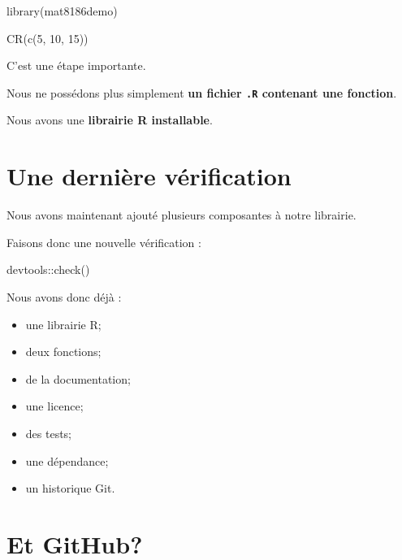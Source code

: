\documentclass[
  letterpaper,
  DIV=11,
  numbers=noendperiod]{scrreprt}
\newenvironment{Shaded}{\begin{snugshade}}{\end{snugshade}}
\newcommand{\DecValTok}[1]{\textcolor[rgb]{0.68,0.00,0.00}{#1}}
\newcommand{\FunctionTok}[1]{\textcolor[rgb]{0.28,0.35,0.67}{#1}}
\newcommand{\NormalTok}[1]{\textcolor[rgb]{0.00,0.23,0.31}{#1}}
\newcommand{\SpecialCharTok}[1]{\textcolor[rgb]{0.37,0.37,0.37}{#1}}
\providecommand{\tightlist}{%
  \setlength{\itemsep}{0pt}\setlength{\parskip}{0pt}}\usepackage{longtable,booktabs,array}
\begin{document}
\begin{Shaded}
\begin{Highlighting}[]
\FunctionTok{library}\NormalTok{(mat8186demo)}

\FunctionTok{CR}\NormalTok{(}\FunctionTok{c}\NormalTok{(}\DecValTok{5}\NormalTok{, }\DecValTok{10}\NormalTok{, }\DecValTok{15}\NormalTok{))}
\end{Highlighting}
\end{Shaded}

C'est une étape importante.

Nous ne possédons plus simplement \textbf{un fichier \texttt{.R}
contenant une fonction}.

Nous avons une \textbf{librairie R installable}.

\section*{Une dernière
vérification}\label{une-derniuxe8re-vuxe9rification}


Nous avons maintenant ajouté plusieurs composantes à notre librairie.

Faisons donc une nouvelle vérification :

\begin{Shaded}
\begin{Highlighting}[]
\NormalTok{devtools}\SpecialCharTok{::}\FunctionTok{check}\NormalTok{()}
\end{Highlighting}
\end{Shaded}

Nous avons donc déjà :

\begin{itemize}
\tightlist
\item
  une librairie R;
\item
  deux fonctions;
\item
  de la documentation;
\item
  une licence;
\item
  des tests;
\item
  une dépendance;
\item
  un historique Git.
\end{itemize}

\section{Et GitHub?}\label{et-github}
\end{document}
